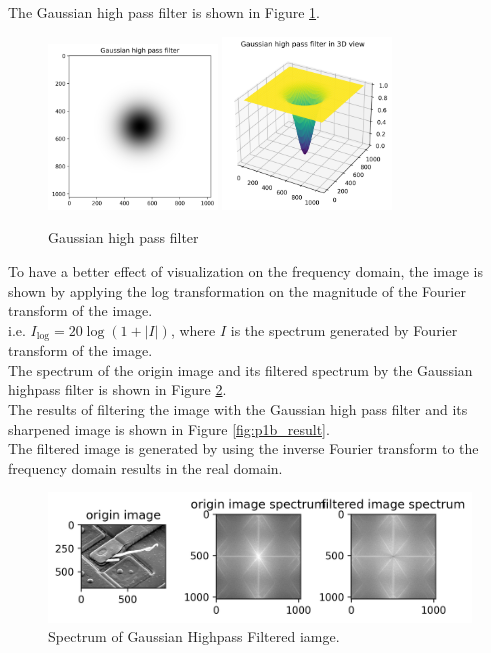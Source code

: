 The Gaussian high pass filter is shown in Figure \ref{fig:p1b_Gaussian}.\\

\begin{figure}[htbp]
    \centering
	\includegraphics[width=0.4\textwidth]{../images/p1/p1b_Gaussian.png}
	\includegraphics[width=0.4\textwidth]{../images/p1/p1b_Gaussian_3D.png}
    \caption{Gaussian high pass filter}
    \label{fig:p1b_Gaussian}
\end{figure}


To have a better effect of visualization on the frequency domain, the image is shown by applying the log transformation on the magnitude of the Fourier transform of the image.\\
i.e. $I_{\text{log}}=20\log(1+|I|)$, where $I$ is the spectrum generated by Fourier transform of the image.\\
The spectrum of the origin image and its filtered spectrum by the Gaussian highpass filter is shown in Figure \ref{fig:p1b_spectrum}.\\
The results of filtering the image with the Gaussian high pass filter and its sharpened image is shown in Figure \ref{fig:p1b_result}.\\
The filtered image is generated by using the inverse Fourier transform to the frequency domain results in the real domain.\\

\begin{figure}[htbp]
    \centering
	\includegraphics[width=\textwidth]{../images/p1/p1b_spectrum.png}
    \caption{Spectrum of Gaussian Highpass Filtered iamge.}
    \label{fig:p1b_spectrum}
\end{figure}

